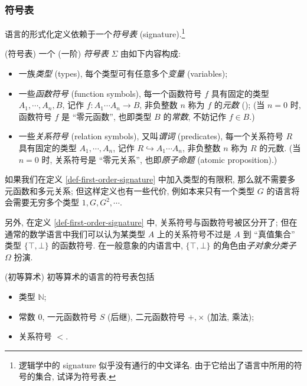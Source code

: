 \subsubsection{符号表}

语言的形式化定义依赖于一个\emph{符号表} (signature).\footnote{逻辑学中的 signature 似乎没有通行的中文译名. 由于它给出了语言中所用的符号的集合, 试译为符号表.}

\begin{definition}
	[label={def-first-order-signature}]
	{(符号表)}
	一个 (一阶) \emph{符号表} $\Sigma$ 由如下内容构成:
	\begin{itemize}
		\item 一族\emph{类型} (types),
		每个类型可有任意多个\emph{变量} (variables)\footnotemark;
		\item 一些\emph{函数符号} (function symbols),
		每一个函数符号 $f$ 具有固定的类型 $A_1,\cdots,A_n,B$, 记作 $f \colon A_1\cdots A_n \to B$, 非负整数 $n$ 称为 $f$ 的\emph{元数} (); (当 $n=0$ 时, 函数符号 $f$ 是 ``零元函数'', 也即类型 $B$ 的\emph{常数}, 不妨记作 $f\in B$.)
		\item 一些\emph{关系符号} (relation symbols), 又叫\emph{谓词} (predicates),
		每一个关系符号 $R$ 具有固定的类型 $A_1,\cdots,A_n$, 记作 $R \hookrightarrow A_1\cdots A_n$, 非负整数 $n$ 称为 $R$ 的元数. (当 $n=0$ 时, 关系符号是 ``零元关系'', 也即\emph{原子命题} (atomic proposition).)
	\end{itemize}
\end{definition}

\begin{remark}{}
	如果我们在定义 \ref{def-first-order-signature} 中加入类型的有限积, 那么就不需要多元函数和多元关系; 但这样定义也有一些代价, 例如本来只有一个类型 $G$ 的语言将会需要无穷多个类型 $1,G,G^2,\cdots$.
	
	另外, 在定义 \ref{def-first-order-signature} 中, 关系符号与函数符号被区分开了; 但在通常的数学语言中我们可以认为某类型 $A$ 上的关系符号不过是 $A$ 到 ``真值集合'' 类型 $\{\top,\bot\}$ 的函数符号. 在一般意象的内语言中, $\{\top,\bot\}$ 的角色由\emph{子对象分类子} $\Omega$ 扮演.
\end{remark}

\begin{example}
	[label={natural-numbers-language}]
	{(初等算术)}
	初等算术的语言的符号表包括
	\begin{itemize}
		\item 类型 $\mathbb{N}$;
		\item 常数 $0$, 一元函数符号 $S$ (后继), 二元函数符号 $+,\times$ (加法, 乘法);
		\item 关系符号 $<$.
	\end{itemize}
\end{example}

